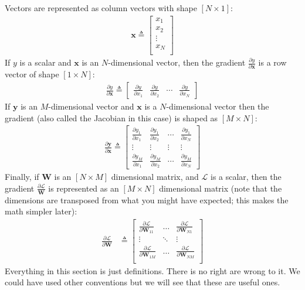 Vectors are represented as column vectors with shape $[N \times 1]$:
\begin{align}
    \mathbf{x} \triangleq 
    \begin{bmatrix}
    x_1  \\
    x_2  \\
    \vdots \\
    x_N \\
    \end{bmatrix}
\end{align}
If $y$ is a scalar and $\mathbf{x}$ is an $N$-dimensional vector, then the gradient $\frac{\partial y}{\partial \mathbf{x}}$ is a row vector of shape  $[1 \times N]$:
\begin{align}
    \frac{\partial y}{\partial \mathbf{x}} \triangleq  
\begin{bmatrix}
    \frac{\partial y}{\partial x_1} & \frac{\partial y}{\partial x_2} & \cdots & \frac{\partial y}{\partial x_N} \label{backprop:scalar_vector_deriv}
\end{bmatrix}
\end{align}
If $\mathbf{y}$ is an $M$-dimensional vector and $\mathbf{x}$ is a $N$-dimensional vector then the gradient (also called the Jacobian in this case) is shaped as $[M \times N]$:
\begin{align}
\frac{\partial \mathbf{y}}{\partial \mathbf{x}} \triangleq  
\begin{bmatrix}
    \frac{\partial y_1}{\partial x_1} & \frac{\partial y_1}{\partial x_2} & \cdots & \frac{\partial y_1}{\partial x_N} \\
    \vdots & \vdots & \vdots & \vdots \\
    \frac{\partial y_M}{\partial x_1} & \frac{\partial y_M}{\partial x_2} & \cdots & \frac{\partial y_M}{\partial x_N}
\end{bmatrix}
\end{align}
Finally, if $\mathbf{W}$ is an $[N \times M]$ dimensional matrix, and $\mathcal{L}$ is a scalar, then the gradient $\frac{\partial \mathcal{L}}{\mathbf{W}}$ is represented as an $[M \times N]$ dimensional matrix (note that the dimensions are transposed from what you might have expected; this makes the math simpler later):
\begin{align}
    \frac{\partial \mathcal{L}}{\partial \mathbf{W}} &\triangleq 
        \begin{bmatrix}
            \frac{\partial \mathcal{L}}{\partial \mathbf{W}_{11}} & \ldots & \frac{\partial \mathcal{L}}{\partial \mathbf{W}_{N1}} \\
            \vdots & \ddots & \vdots \\
            \frac{\partial \mathcal{L}}{\partial \mathbf{W}_{1M}} & \ldots & \frac{\partial \mathcal{L}}{\partial \mathbf{W}_{NM}} \\
        \end{bmatrix} \label{backprop:scalar_matrix_deriv}
\end{align}
Everything in this section is just definitions. There is no right are wrong to it. We could have used other conventions but we will see that these are useful ones.

